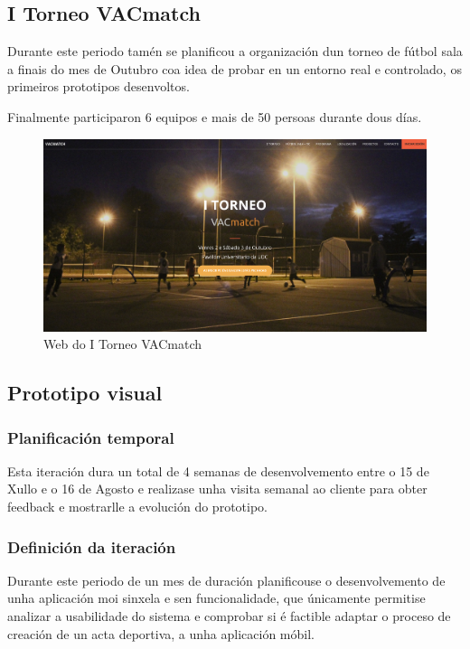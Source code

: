     \subsection{I Torneo VACmatch}
    Durante este periodo tamén se planificou a organización dun torneo de 
fútbol sala a finais do mes de Outubro coa idea de probar en un entorno real 
e controlado, os primeiros prototipos desenvoltos.

    Finalmente participaron 6 equipos e mais de 50 persoas durante dous días.

    \begin{figure}[h!]
          \begin{center}
          \includegraphics[width=\textwidth]{./img/torneo_vacmatch.png}
          \caption{Web do I Torneo VACmatch}
          \end{center}
    \end{figure}

    \subsection{Prototipo visual}

      \subsubsection{Planificación temporal}
      Esta iteración dura un total de 4 semanas de desenvolvemento entre o 15 
de Xullo e o 16 de Agosto e realizase unha visita semanal ao cliente para obter 
feedback e mostrarlle a evolución do prototipo.

      \subsubsection{Definición da iteración}
      Durante este periodo de un mes de duración planificouse o desenvolvemento 
de unha aplicación moi sinxela e sen funcionalidade, que únicamente permitise 
analizar a usabilidade do sistema e comprobar si é factible adaptar o proceso 
de creación de un acta deportiva, a unha aplicación móbil.

